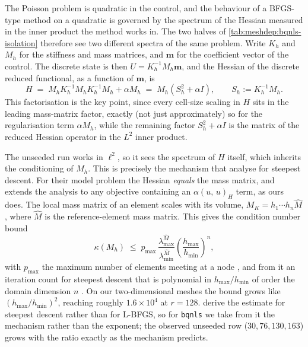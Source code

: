 \documentclass[a4paper,11pt]{article}
\newcommand{\inner}[3]{(#1,\,#2)_{#3}}        %
\theoremstyle{spacedplain} \newtheorem{theorem}[counter]{Theorem} \newtheorem{lemma}[counter]{Lemma} \newtheorem{prop}[counter]{Proposition} \newtheorem{cor}[counter]{Corollary}
\theoremstyle{spaceddefinition} \newtheorem{defn}[counter]{Definition} \newtheorem{example}[counter]{Example} \newtheorem{remark}[counter]{Remark}
\begin{document}
The Poisson problem is quadratic in the control, and the behaviour of a BFGS-type method on a quadratic is governed by the spectrum of the Hessian measured in the inner product the method works in. The two halves of \cref{tab:meshdep:bqnls-isolation} therefore see two different spectra of the same problem. Write $K_h$ and $M_h$ for the stiffness and mass matrices, and $\mathbf{m}$ for the coefficient vector of the control. The discrete state is then $U = K_h^{-1} M_h \mathbf{m}$, and the Hessian of the discrete reduced functional, as a function of $\mathbf{m}$, is
\begin{equation}
  \label{eq:meshdep:bqnls-hessian}
  H \;=\; M_h K_h^{-1} M_h K_h^{-1} M_h + \alpha M_h
    \;=\; M_h \left( S_h^{2} + \alpha I \right),
  \qquad S_h := K_h^{-1} M_h .
\end{equation}
This factorisation is the key point, since every cell-size scaling in $H$ sits in the leading mass-matrix factor, exactly (not just approximately) so for the regularisation term $\alpha M_h$, while the remaining factor $S_h^{2} + \alpha I$ is the matrix of the reduced Hessian operator in the $L^{2}$ inner product.

The unseeded run works in $\ell^{2}$, so it sees the spectrum of $H$ itself, which inherits the conditioning of $M_h$. This is precisely the mechanism that \citet[Sect.~2.2.4]{shfp2017} analyse for steepest descent. For their model problem the Hessian \emph{equals} the mass matrix, and \citet[Remark~2.2.4.1]{shfp2017} extends the analysis to any objective containing an $\alpha \inner{u}{u}{H}$ term, as ours does. The local mass matrix of an element scales with its volume, $M_K = h_1 \cdots h_n \hat{M}$ \citep[(2.36)]{shfp2017}, where $\hat{M}$ is the reference-element mass matrix. This gives the condition number bound
\begin{equation}
  \kappa(M_h) \;\le\; p_{\max}\,
  \frac{\lambda_{\max}^{\hat M}}{\lambda_{\min}^{\hat M}}
  \left( \frac{h_{\max}}{h_{\min}} \right)^{\! n},
\end{equation}
with $p_{\max}$ the maximum number of elements meeting at a node \citep[(2.40)]{shfp2017}, and from it an iteration count for steepest descent that is polynomial in $h_{\max}/h_{\min}$ of order the domain dimension $n$ \citep[(2.44)]{shfp2017}. On our two-dimensional meshes the bound grows like $(h_{\max}/h_{\min})^{2}$, reaching roughly $1.6 \times 10^{4}$ at $r = 128$. \citet{shfp2017} derive the estimate for steepest descent rather than for L-BFGS, so for \texttt{bqnls} we take from it the mechanism rather than the exponent; the observed unseeded row ($30, 76, 130, 163$) grows with the ratio exactly as the mechanism predicts.
\end{document}
